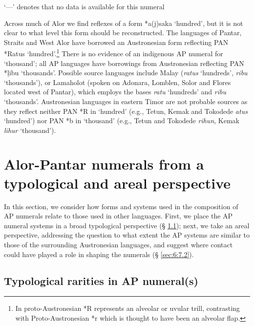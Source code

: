 \begin{table}
 {\dag} `---' denotes that no data is available for this numeral
\end{table}


Across much of Alor we find reflexes of a form *a(j)saka `hundred', but it is not clear to what level this form should be reconstructed. The languages of Pantar, Straits and West Alor have borrowed an Austronesian form reflecting PAN *Ratus `hundred'.\footnote{In proto-Austronesian *R represents an alveolar or uvular trill, contrasting with Proto-Austronesian *r which is thought to have been an alveolar flap.} There is no evidence of an indigenous AP numeral for `thousand'; all AP languages have borrowings from Austronesian reflecting PAN *ḷibu `thousands'. Possible source languages include Malay (\textit{ratus} `hundreds', \textit{ribu} `thousands'), or Lamaholot (spoken on Adonara, Lomblen, Solor and Flores located west of Pantar), which employs the bases \textit{ratu} `hundreds' and \textit{ribu} `thousands'. Austronesian languages in eastern Timor are not probable sources as they reflect neither PAN *R in `hundred' (e.g., Tetun, Kemak and Tokodede \textit{atus} `hundred') nor PAN *b in `thousand' (e.g., Tetun and Tokodede \textit{rihun}, Kemak \textit{lihur} `thousand').

\section{Alor-Pantar numerals from a typological and areal perspective} \label{sec:6:7}
In this section, we consider how forms and systems used in the composition of AP numerals relate to those used in other languages. First, we place the AP numeral systems in a broad typological perspective ({\S} \ref{sec:6:7.1}); next, we take an areal perspective, addressing the question to what extent the AP systems are similar to those of the surrounding Austronesian languages, and suggest where contact could have played a role in shaping the numerals ({\S} \ref{sec:6:7.2}).

\subsection{Typological rarities in AP numeral(s)}\label{sec:6:7.1} 

